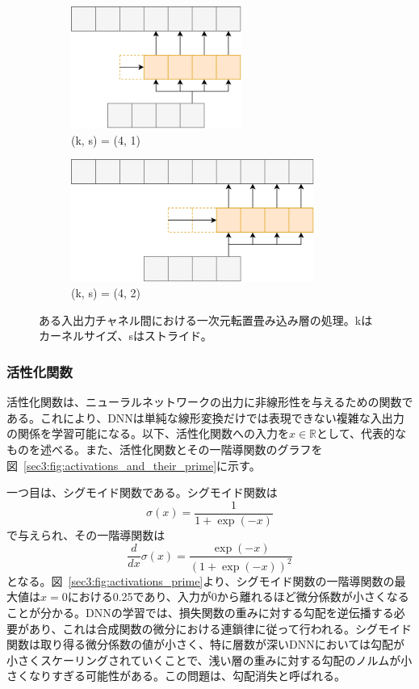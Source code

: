 \documentclass[12pt]{jarticle}
\numberwithin{equation}{section}    %
\numberwithin{figure}{section}      %
\numberwithin{table}{section}      %
\begin{document}
\begin{figure}[tb]
    \centering
    \begin{subfigure}[b]{0.48\textwidth}
        \centering
        \includegraphics[height=4cm]{./figure/sec3/tconv1.drawio.png}
        \caption{(k, s) = (4, 1)}
        \label{sec3:fig:tconv1}
    \end{subfigure}
    \begin{subfigure}[b]{0.48\textwidth}
        \centering
        \includegraphics[height=4cm]{./figure/sec3/tconv2.drawio.png}
        \caption{(k, s) = (4, 2)}
        \label{sec3:fig:tconv2}
    \end{subfigure}
    \caption{ある入出力チャネル間における一次元転置畳み込み層の処理。kはカーネルサイズ、sはストライド。}
    \label{sec3:fig:tconv_variations}
\end{figure}
\subsubsection{活性化関数}
活性化関数は、ニューラルネットワークの出力に非線形性を与えるための関数である。これにより、DNNは単純な線形変換だけでは表現できない複雑な入出力の関係を学習可能になる。以下、活性化関数への入力を$x \in \mathbb{R}$として、代表的なものを述べる。また、活性化関数とその一階導関数のグラフを図~\ref{sec3:fig:activations_and_their_prime}に示す。

一つ目は、シグモイド関数である。シグモイド関数は
\begin{equation}
    \sigma(x) = \frac{1}{1 + \exp(-x)}
\end{equation}
で与えられ、その一階導関数は
\begin{equation}
    \frac{d}{dx}\sigma(x) = \frac{\exp(-x)}{(1 + \exp(-x))^{2}}
\end{equation}
となる。図~\ref{sec3:fig:activations_prime}より、シグモイド関数の一階導関数の最大値は$x=0$における0.25であり、入力が0から離れるほど微分係数が小さくなることが分かる。DNNの学習では、損失関数の重みに対する勾配を逆伝播する必要があり、これは合成関数の微分における連鎖律に従って行われる。シグモイド関数は取り得る微分係数の値が小さく、特に層数が深いDNNにおいては勾配が小さくスケーリングされていくことで、浅い層の重みに対する勾配のノルムが小さくなりすぎる可能性がある。この問題は、勾配消失と呼ばれる。
\end{document}
